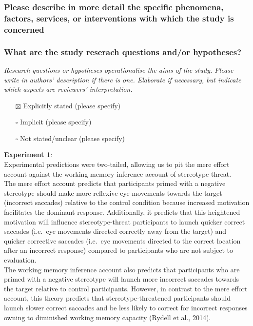 \documentclass[
  doc, a4paper]{apa7}
\providecommand{\tightlist}{%
  \setlength{\itemsep}{0pt}\setlength{\parskip}{0pt}}
\begin{document}
\subsubsection{Please describe in more detail the specific phenomena, factors, services, or interventions with which the study is concerned}\label{please-describe-in-more-detail-the-specific-phenomena-factors-services-or-interventions-with-which-the-study-is-concerned}

\subsubsection{What are the study reserach questions and/or hypotheses?}\label{what-are-the-study-reserach-questions-andor-hypotheses}

\emph{Research questions or hypotheses operationalise the aims of the study. Please write in authors' description if there is one. Elaborate if necessary, but indicate which aspects are reviewers' interpretation.}

\begin{itemize}
\tightlist
\item[$\boxtimes$]
  Explicitly stated (please specify)\\
\item[$\square$]
  Implicit (please specify)\\
\item[$\square$]
  Not stated/unclear (please specify)
\end{itemize}

\textbf{Experiment 1}:\\
Experimental predictions were two-tailed, allowing us to pit the mere effort account against the working memory inference account of stereotype threat.\\
The mere effort account predicts that participants primed with a negative stereotype should make more reflexive eye movements towards the target (incorrect saccades) relative to the control condition because increased motivation facilitates the dominant response. Additionally, it predicts that this heightened motivation will influence stereotype-threat participants to launch quicker correct saccades (i.e.~eye movements directed correctly away from the target) and quicker corrective saccades (i.e.~eye movements directed to the correct location after an incorrect response) compared to participants who are not subject to evaluation.\\
The working memory inference account also predicts that participants who are primed with a negative stereotype will launch more incorrect saccades towards the target relative to control participants. However, in contrast to the mere effort account, this theory predicts that stereotype-threatened participants should launch slower correct saccades and be less likely to correct for incorrect responses owning to diminished working memory capacity (Rydell et al., 2014).
\end{document}

